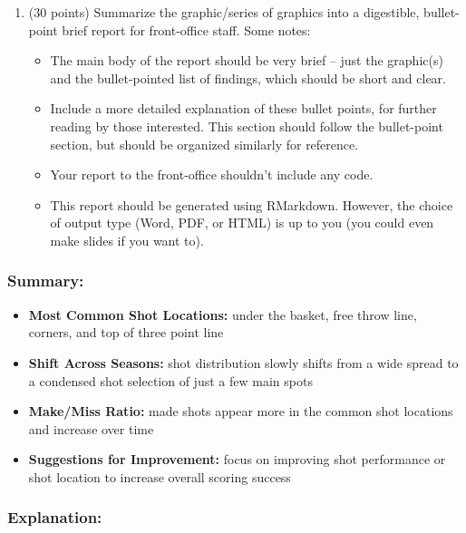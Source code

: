 \documentclass[
]{article}
\providecommand{\tightlist}{%
  \setlength{\itemsep}{0pt}\setlength{\parskip}{0pt}}
\begin{document}
\begin{enumerate}
\def\labelenumi{\arabic{enumi}.}
\setcounter{enumi}{1}
\item
  (30 points) Summarize the graphic/series of graphics into a
  digestible, bullet-point brief report for front-office staff. Some
  notes:

  \begin{itemize}
  \tightlist
  \item
    The main body of the report should be very brief -- just the
    graphic(s) and the bullet-pointed list of findings, which should be
    short and clear.
  \item
    Include a more detailed explanation of these bullet points, for
    further reading by those interested. This section should follow the
    bullet-point section, but should be organized similarly for
    reference.
  \item
    Your report to the front-office shouldn't include any code.
  \item
    This report should be generated using RMarkdown. However, the choice
    of output type (Word, PDF, or HTML) is up to you (you could even
    make slides if you want to).
  \end{itemize}
\end{enumerate}

\subsubsection{\texorpdfstring{\textbf{Summary:}}{Summary:}}\label{summary}

\begin{itemize}
\item
  \textbf{Most Common Shot Locations:} under the basket, free throw
  line, corners, and top of three point line
\item
  \textbf{Shift Across Seasons:} shot distribution slowly shifts from a
  wide spread to a condensed shot selection of just a few main spots
\item
  \textbf{Make/Miss Ratio:} made shots appear more in the common shot
  locations and increase over time
\item
  \textbf{Suggestions for Improvement:} focus on improving shot
  performance or shot location to increase overall scoring success
\end{itemize}

\subsubsection{\texorpdfstring{\textbf{Explanation:}}{Explanation:}}\label{explanation}
\end{document}
